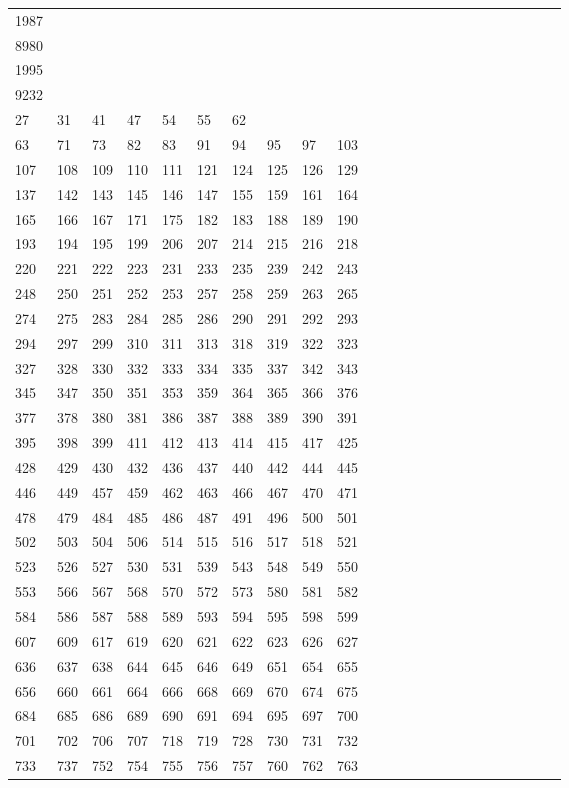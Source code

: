 \begin{longtable}{*{24}{l}}
1987& \\
8980&&&&&&&&&\\
1995& \\
9232&&&&&&&&&\\
27& 31& 41& 47& 54& 55& 62\\
63& 71& 73& 82& 83& 91& 94& 95& 97& 103\\
107& 108& 109& 110& 111& 121& 124& 125& 126& 129\\
137& 142& 143& 145& 146& 147& 155& 159& 161& 164\\
165& 166& 167& 171& 175& 182& 183& 188& 189& 190\\
193& 194& 195& 199& 206& 207& 214& 215& 216& 218\\
220& 221& 222& 223& 231& 233& 235& 239& 242& 243\\
248& 250& 251& 252& 253& 257& 258& 259& 263& 265\\
274& 275& 283& 284& 285& 286& 290& 291& 292& 293\\
294& 297& 299& 310& 311& 313& 318& 319& 322& 323\\
327& 328& 330& 332& 333& 334& 335& 337& 342& 343\\
345& 347& 350& 351& 353& 359& 364& 365& 366& 376\\
377& 378& 380& 381& 386& 387& 388& 389& 390& 391\\
395& 398& 399& 411& 412& 413& 414& 415& 417& 425\\
428& 429& 430& 432& 436& 437& 440& 442& 444& 445\\
446& 449& 457& 459& 462& 463& 466& 467& 470& 471\\
478& 479& 484& 485& 486& 487& 491& 496& 500& 501\\
502& 503& 504& 506& 514& 515& 516& 517& 518& 521\\
523& 526& 527& 530& 531& 539& 543& 548& 549& 550\\
553& 566& 567& 568& 570& 572& 573& 580& 581& 582\\
584& 586& 587& 588& 589& 593& 594& 595& 598& 599\\
607& 609& 617& 619& 620& 621& 622& 623& 626& 627\\
636& 637& 638& 644& 645& 646& 649& 651& 654& 655\\
656& 660& 661& 664& 666& 668& 669& 670& 674& 675\\
684& 685& 686& 689& 690& 691& 694& 695& 697& 700\\
701& 702& 706& 707& 718& 719& 728& 730& 731& 732\\
733& 737& 752& 754& 755& 756& 757& 760& 762& 763\\

\end{longtable}

